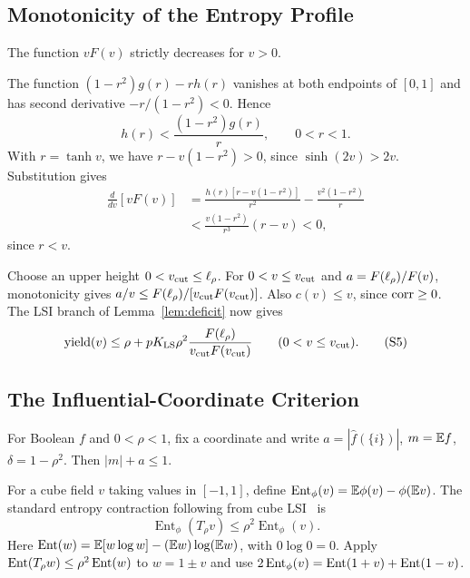 \subsection{Monotonicity of the Entropy Profile}
\label{a-short-proof-that-vfv-decreases}

\begin{appendixlemma}
\label{lem:global-profile}
The function \(vF(v)\) strictly decreases for \(v>0\).
\end{appendixlemma}

The function \((1-r^2)g(r)-r h(r)\) vanishes at both endpoints of
\([0,1]\) and has second derivative \(-r/(1-r^2)<0\). Hence
\[
                   h(r)<\frac{(1-r^2)g(r)}r,\qquad 0<r<1.
\]
With \(r=\tanh v\), we have \(r-v(1-r^2)>0\), since
\(\sinh(2v)>2v\). Substitution gives
\begin{align*}
 \frac{d}{dv}[vF(v)]
 &=\frac{h(r)[r-v(1-r^2)]}{r^2}-\frac{v^2(1-r^2)}r\\
 &<\frac{v(1-r^2)}{r^3}(r-v)<0,
\end{align*}
since \(r<v\).

Choose an upper height \(0<v_{\mathrm{cut}}\le\ell_\rho\). For \(0<v\le v_{\mathrm{cut}}\) and
\(a=F(\ell_\rho)/F(v)\), monotonicity gives
\(a/v\le F(\ell_\rho)/[v_{\mathrm{cut}} F(v_{\mathrm{cut}})]\).
Also \(c(v)\le v\), since \(\operatorname{corr}\ge0\).
The LSI branch of Lemma~\ref{lem:deficit} now gives
\[
 \operatorname{yield}(v)\le\rho+pK_{\mathrm{LS}}\rho^2\frac{F(\ell_\rho )}{v_{\mathrm{cut}} F(v_{\mathrm{cut}})}
                   \qquad(0<v\le v_{\mathrm{cut}}).                 \tag{S5}\label{eq:scalar-S5}
\]





\subsection{The Influential-Coordinate Criterion}\label{a-large-singleton-coefficient-already-proves-ck}

For Boolean \(f\) and \(0<\rho<1\), fix a coordinate and write
\(a=|\widehat f(\{i\})|\), \(m=\mathbb E f\), \(\delta=1-\rho^2\).
Then \(|m|+a\le1\).

For a cube field \(v\) taking values in \([-1,1]\), define
\(\operatorname{Ent}_{\phi}(v)=\mathbb E\phi(v)-\phi(\mathbb E v)\).
The standard entropy contraction following from cube
LSI~\cite{Gross,ODonnell} is
\[
 \operatorname{Ent}_{\phi}(T_\rho v)
                 \le\rho^2\operatorname{Ent}_{\phi}(v).       \tag{S6a}\label{eq:scalar-S6a}
\]
Here \(\operatorname{Ent}(w)=\mathbb E[w\log w]-(\mathbb E w)\log(\mathbb E w)\), with \(0\log0=0\).
Apply \(\operatorname{Ent}(T_\rho w)\le\rho^2\operatorname{Ent}(w)\) to \(w=1\pm v\)
and use
\(2\operatorname{Ent}_{\phi}(v)=\operatorname{Ent}(1+v)+\operatorname{Ent}(1-v)\).

